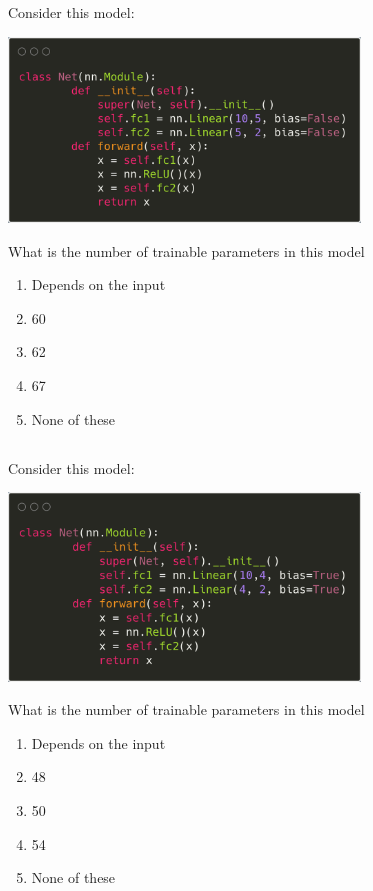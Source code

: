 \begin{frame}
\section{}
Consider this model:

\includegraphics[width=0.7\textwidth]{images/quiz_4_4_2_3.png}

What is the number of trainable parameters in this model


\begin{enumerate}[label=(\Alph*)]
\item Depends on the input
\item 60    %
\item 62
\item 67
\item None of these   %
\end{enumerate}

\end{frame}


\begin{frame}
\section{}
Consider this model:

\includegraphics[width=0.7\textwidth]{images/quiz_4_4_2_4.png}

What is the number of trainable parameters in this model


\begin{enumerate}[label=(\Alph*)]
\item Depends on the input
\item 48
\item 50
\item 54     %
\item None of these   %
\end{enumerate}

\end{frame}


